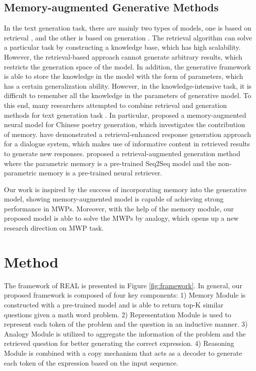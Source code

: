 \documentclass[11pt, a4paper]{article}
\begin{document}
\subsection{Memory-augmented Generative Methods}
In the text generation task, there are mainly two types of models, one is based on retrieval \cite{zhou2016multi, zhou2018multi, zhang2018modeling, chen-etal-2019-bidirectional, wang2019multi}, and the other is based on generation \cite{qian2017assigning, zhou2018mojitalk, dong2019unified, han2019deep}. The retrieval algorithm can solve a particular task by constructing a knowledge base, which has high scalability. However, the retrieval-based approach cannot generate arbitrary results, which restricts the generation space of the model. In addition, the generative framework is able to store the knowledge in the model with the form of parameters, which has a certain generalization ability. However, in the knowledge-intensive task, it is difficult to remember all the knowledge in the parameters of generative model. To this end, many researchers attempted to combine retrieval and generation methods for text generation task \citep{zhang2017flexible, zhu2019retrieval, lewis2020retrieval, koncel2019text, chen2019towards, zhou2020improving}. In particular, \citet{zhang2017flexible} proposed a memory-augmented neural model for Chinese poetry generation, which investigates the contribution of memory. \citet{zhu2019retrieval} have demonstrated a retrieval-enhanced response generation approach for a dialogue system, which makes use of informative content in retrieved results to generate new responses. \citet{lewis2020retrieval} proposed a retrieval-augmented generation method where the parametric memory is a pre-trained Seq2Seq model and the non-parametric memory is a pre-trained neural retriever.

Our work is inspired by the success of incorporating memory into the generative model, showing memory-augmented model is capable of achieving strong performance in MWPs. Moreover, with the help of the memory module, our proposed model is able to solve the MWPs by analogy, which opens up a new research direction on MWP task.

\section{Method}
The framework of REAL is presented in Figure \ref{fig:framework}. In general, our proposed framework is composed of four key components: 1) Memory Module is constructed with a pre-trained model and is able to return top-K similar questions given a math word problem. 2) Representation Module is used to represent each token of the problem and the question in an inductive manner. 3) Analogy Module is utilized to aggregate the information of the problem and the retrieved question for better generating the correct expression. 4) Reasoning Module is combined with a copy mechanism that acts as a decoder to generate each token of the expression based on the input sequence.
\end{document}
